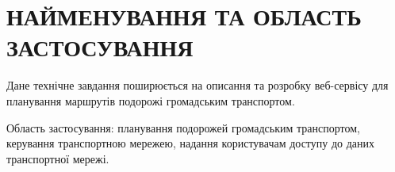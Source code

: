 \chapter{НАЙМЕНУВАННЯ ТА ОБЛАСТЬ ЗАСТОСУВАННЯ}

\vspace{-\baselineskip}

Дане технічне завдання поширюється на описання та розробку веб-сервісу для планування маршрутів подорожі громадським
транспортом.

Область застосування: планування подорожей громадським транспортом, керування транспортною мережею, надання користувачам доступу до даних транспортної мережі.

\bigskip
\bigskip
\bigskip
\bigskip